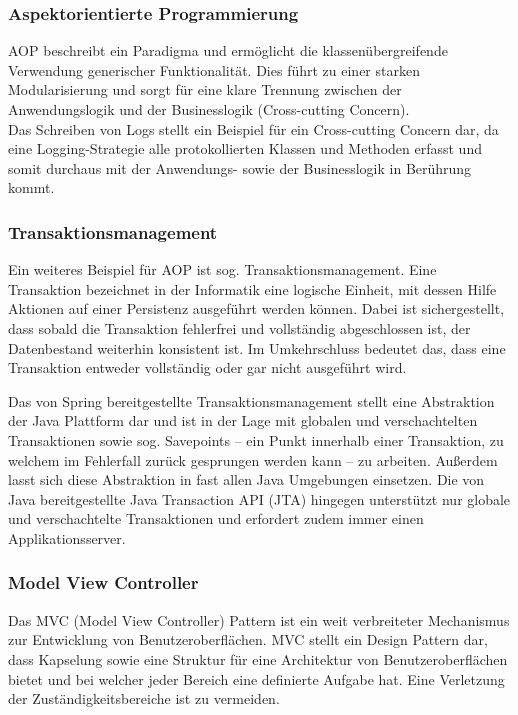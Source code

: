 			\subsubsection{Aspektorientierte Programmierung}
			
				\acs{AOP} beschreibt ein Paradigma und ermöglicht die klassenübergreifende Verwendung generischer Funktionalität. Dies führt zu einer starken Modularisierung und sorgt für eine klare Trennung zwischen der Anwendungslogik und der Businesslogik (Cross-cutting Concern). \cite{Wunderlich.2005} \\
				Das Schreiben von Logs stellt ein Beispiel für ein Cross-cutting Concern dar, da eine Logging-Strategie alle protokollierten Klassen und Methoden erfasst und somit durchaus mit der Anwendungs- sowie der Businesslogik in Berührung kommt. 
			
			\subsubsection{Transaktionsmanagement} %
			\label{frameworks.spring.transaktionsmanagement}
			
				Ein weiteres Beispiel für \acs{AOP} ist sog. Transaktionsmanagement. Eine Transaktion bezeichnet in der Informatik eine logische Einheit, mit dessen Hilfe Aktionen auf einer Persistenz ausgeführt werden können. Dabei ist sichergestellt, dass sobald die Transaktion fehlerfrei und vollständig abgeschlossen ist, der Datenbestand weiterhin konsistent ist. Im Umkehrschluss bedeutet das, dass eine Transaktion entweder vollständig oder gar nicht ausgeführt wird. \cite{Ozsu.2011}
			
				Das von Spring bereitgestellte Transaktionsmanagement stellt eine Abstraktion der Java Plattform dar und ist in der Lage mit globalen und verschachtelten Transaktionen sowie sog. Savepoints -- ein Punkt innerhalb einer Transaktion, zu welchem im Fehlerfall zurück gesprungen werden kann -- zu arbeiten. Außerdem lasst sich diese Abstraktion in fast allen Java Umgebungen einsetzen. Die von Java bereitgestellte Java Transaction API (\acs{JTA}) hingegen unterstützt nur globale und verschachtelte Transaktionen und erfordert zudem immer einen Applikationsserver. 
			
			\subsubsection{Model View Controller} %
			
				Das \acs{MVC} (Model View Controller) Pattern ist ein weit verbreiteter Mechanismus zur Entwicklung von Benutzeroberflächen. \acs{MVC} stellt ein Design Pattern dar, dass Kapselung sowie eine Struktur für eine Architektur von Benutzeroberflächen bietet und bei welcher jeder Bereich eine definierte Aufgabe hat. Eine Verletzung der Zuständigkeitsbereiche ist zu vermeiden. \cite{Gamma.1995}
			
